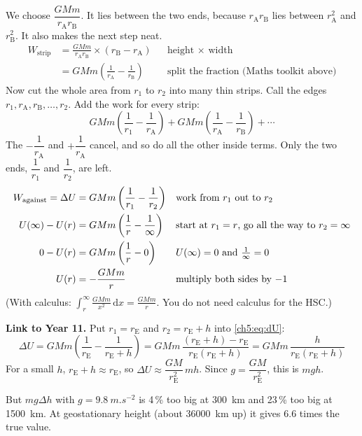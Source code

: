We choose $\dfrac{GMm}{r_\mathrm{A} r_\mathrm{B}}$. It lies between the two ends, because
$r_\mathrm{A} r_\mathrm{B}$ lies between $r_\mathrm{A}^2$ and $r_\mathrm{B}^2$. It also makes the next step neat.
\begin{align*}
  W_\text{strip} &= \frac{GMm}{r_\mathrm{A} r_\mathrm{B}} \times (r_\mathrm{B} - r_\mathrm{A})
     && \text{height $\times$ width}\\
  &= GMm\left(\frac{1}{r_\mathrm{A}} - \frac{1}{r_\mathrm{B}}\right)
     && \text{split the fraction (Maths toolkit above)}
\end{align*}
Now cut the whole area from $r_1$ to $r_2$ into many thin strips. Call the edges
$r_1, r_\mathrm{A}, r_\mathrm{B}, \ldots, r_2$. Add the work for every strip:
\[ GMm\left(\frac{1}{r_1} - \frac{1}{r_\mathrm{A}}\right) + GMm\left(\frac{1}{r_\mathrm{A}} - \frac{1}{r_\mathrm{B}}\right) + \cdots \]
The $-\dfrac{1}{r_\mathrm{A}}$ and $+\dfrac{1}{r_\mathrm{A}}$ cancel, and so do all the other
inside terms. Only the two ends, $\dfrac{1}{r_1}$ and $\dfrac{1}{r_2}$, are left.
\begin{align}
  W_\text{against} = \Delta U &= GMm\left(\frac{1}{r_1} - \frac{1}{r_2}\right)
     && \text{work from $r_1$ out to $r_2$}\label{ch5:eq:dU}\\
  U(\infty) - U(r) &= GMm\left(\frac{1}{r} - \frac{1}{\infty}\right)
     && \text{start at $r_1 = r$, go all the way to $r_2 = \infty$}\notag\\
  0 - U(r) &= GMm\left(\frac{1}{r} - 0\right)
     && U(\infty) = 0 \text{ and } \tfrac{1}{\infty} = 0\notag\\
  U(r) &= -\frac{GMm}{r}
     && \text{multiply both sides by $-1$}\notag
\end{align}
(With calculus: $\int_r^\infty \frac{GMm}{x^2}\,\mathrm{d}x = \frac{GMm}{r}$. You
do not need calculus for the HSC.)

\textbf{Link to Year 11.} Put $r_1 = r_\mathrm{E}$ and $r_2 = r_\mathrm{E} + h$
into \cref{ch5:eq:dU}:
\[ \Delta U = GMm\left(\frac{1}{r_\mathrm{E}} - \frac{1}{r_\mathrm{E} + h}\right)
   = GMm\,\frac{(r_\mathrm{E} + h) - r_\mathrm{E}}{r_\mathrm{E}(r_\mathrm{E} + h)}
   = GMm\,\frac{h}{r_\mathrm{E}(r_\mathrm{E} + h)} \]
For a small $h$, $r_\mathrm{E} + h \approx r_\mathrm{E}$, so
$\Delta U \approx \dfrac{GM}{r_\mathrm{E}^2}\,mh$. Since
$g = \dfrac{GM}{r_\mathrm{E}^2}$, this is $mgh$.

But $mg\Delta h$ with $g = \qty{9.8}{m.s^{-2}}$ is 4\,\% too big at
\qty{300}{km} and 23\,\% too big at \qty{1500}{km}. At geostationary height
(about \qty{36000}{km} up) it gives 6.6 times the true value.

